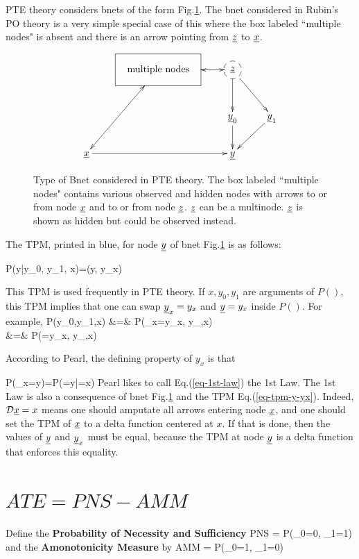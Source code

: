 PTE theory considers bnets of the form
Fig.\ref{fig-pte-bnet}.
The bnet considered in Rubin's
PO theory
is a very simple special case
of this where the box
labeled ``multiple nodes"
is absent and there is an
arrow pointing
from ${\underline{z}}$ to ${\underline{x}}$.


\begin{figure}[h!]
$$
\xymatrix{
&*++++[F]{\text{multiple nodes}}\ar@{<->}[ldd]
\ar@{<->}[r]
&*++[F-o]{\rvz}\ar[rd]\ar[d]
\\
&&\rvy_0\ar[d]
&\rvy_1\ar[ld]
\\
\rvx\ar[rr]
&&\rvy
}$$
\caption{Type of Bnet
considered in PTE theory.
The box labeled ``multiple nodes"
contains various observed 
and hidden nodes with
arrows
to or from node ${\underline{x}}$
and to or from
node ${\underline{z}}$.
${\underline{z}}$ can be a multinode.
${\underline{z}}$ 
is shown
as hidden but
could be observed instead.
}
\label{fig-pte-bnet}
\end{figure}

The TPM, printed in blue,
 for node ${\underline{y}}$
of bnet Fig.\ref{fig-pte-bnet}
is as follows:


\beq\color{blue}
P(y|y_0, y_1, x)=\delta(y, y_x)
\label{eq-tpm-y-yx}
\eeq

This TPM is used 
frequently
in PTE theory.  If $x,y_0, y_1$
are arguments
of $P()$, this TPM implies that one
can swap 
${\underline{y}}_x=y_x$
and ${\underline{y}}=y_x$
inside $P()$. For example,
\beqa
P(y_0,y_1,x)
&=&
P({\color{red}\rvy_x}=y_x,
 y_{},x)
\\
&=&
P({\color{red}\rvy}=y_x,
 y_{},x)
\eeqa

According to Pearl, the defining
property of $y_x$ is that 


\beq
P(\rvy_x=y)=P(\rvy=y|\cald\rvx=x)
\label{eq-1st-law}
\eeq
Pearl likes to call 
Eq.(\ref{eq-1st-law})
the 1st Law. The 1st Law is also a
consequence of bnet Fig.\ref{fig-pte-bnet}
and the TPM Eq.(\ref{eq-tpm-y-yx}).
Indeed, 
${\cal D}{\underline{x}}=x$
means one should amputate
all arrows entering
node ${\underline{x}}$, and one should set
the TPM of ${\underline{x}}$ to a delta
function centered at $x$.
If that is done, then
the values
of ${\underline{y}}$ and ${\underline{y}}_x$ must
be equal, 
because the TPM at node ${\underline{y}}$
is a delta function that
enforces this equality.

\section{$ATE = PNS - AMM$}

Define the {\bf Probability of Necessity and Sufficiency}
\beq
PNS = P(\rvy_0=0, \rvy_1=1)
\eeq
and the {\bf Amonotonicity Measure} by
\beq
AMM = P(\rvy_0=1, \rvy_1=0)
\eeq

